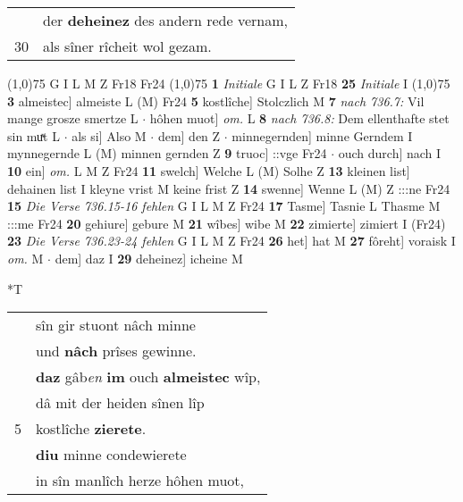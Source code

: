 \documentclass[8pt,a4paper,notitlepage]{article}
\begin{document}
\begin{table}[ht]
\begin{minipage}[t]{0.5\linewidth}
\begin{tabular}{rl}
 & der \textbf{deheinez} des andern rede vernam,\\ 
30 & als sîner rîcheit wol gezam.\\ 
\end{tabular}
\scriptsize
\line(1,0){75} \newline
G I L M Z Fr18 Fr24 \newline
\line(1,0){75} \newline
\textbf{1} \textit{Initiale} G I L Z Fr18  \textbf{25} \textit{Initiale} I  \newline
\line(1,0){75} \newline
\textbf{3} almeistec] almeiste L (M) Fr24 \textbf{5} kostlîche] Stolczlich M \textbf{7} \textit{nach 736.7:} Vil mange grosze smertze L   $\cdot$ hôhen muot] \textit{om.} L \textbf{8} \textit{nach 736.8:} Dem ellenthafte stet sin muͯt L   $\cdot$ als si] Also M  $\cdot$ dem] den Z  $\cdot$ minnegernden] minne Gerndem I mynnegernde L (M) minnen gernden Z \textbf{9} truoc] ::vge Fr24  $\cdot$ ouch durch] nach I \textbf{10} ein] \textit{om.} L M Z Fr24 \textbf{11} swelch] Welche L (M) Solhe Z \textbf{13} kleinen list] dehainen list I kleyne vrist M keine frist Z \textbf{14} swenne] Wenne L (M) Z :::ne Fr24 \textbf{15} \textit{Die Verse 736.15-16 fehlen} G I L M Z Fr24  \textbf{17} Tasme] Tasnie L Thasme M :::me Fr24 \textbf{20} gehiure] gebure M \textbf{21} wîbes] wibe M \textbf{22} zimierte] zimiert I (Fr24) \textbf{23} \textit{Die Verse 736.23-24 fehlen} G I L M Z Fr24  \textbf{26} het] hat M \textbf{27} fôreht] voraisk I \textit{om.} M  $\cdot$ dem] daz I \textbf{29} deheinez] icheine M \newline
\end{minipage}
\hspace{0.5cm}
\begin{minipage}[t]{0.5\linewidth}
\small
\begin{center}*T
\end{center}
\begin{tabular}{rl}
 & sîn gir stuont nâch minne\\ 
 & und \textbf{nâch} prîses gewinne.\\ 
 & \textbf{daz} gâb\textit{en} \textbf{im} ouch \textbf{almeistec} wîp,\\ 
 & dâ mit der heiden sînen lîp\\ 
5 & kostlîche \textbf{zierete}.\\ 
 & \textbf{diu} minne condewierete\\ 
 & in sîn manlîch herze hôhen muot,\\ 

\end{tabular}
\end{minipage}
\end{table}
\end{document}
